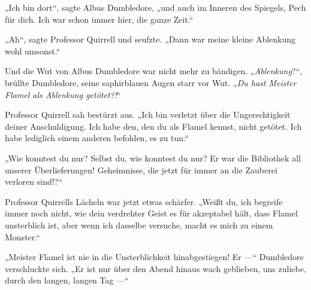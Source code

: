„Ich bin dort“, sagte Albus Dumbledore, „und auch im Inneren des Spiegels, Pech für dich. Ich war schon immer hier, die ganze Zeit.“

„Ah“, sagte Professor Quirrell und seufzte.
„Dann war meine kleine Ablenkung wohl umsonst.“

Und die Wut von Albus Dumbledore war nicht mehr zu bändigen.
„\emph{Ablenkung}?“, brüllte Dumbledore, seine saphirblauen Augen starr vor Wut.
„\emph{Du hast Meister Flamel als Ablenkung getötet?!}“

Professor Quirrell sah bestürzt aus.
„Ich bin verletzt über die Ungerechtigkeit deiner Anschuldigung. Ich habe den, den du als Flamel kennst, nicht getötet. Ich habe lediglich einem anderen befohlen, es zu tun.“

„Wie konntest du nur? Selbst du, wie konntest du nur? Er war die Bibliothek all unserer Überlieferungen! Geheimnisse, die jetzt für immer an die Zauberei verloren sind!?“

Professor Quirrells Lächeln war jetzt etwas schärfer.
„Weißt du, ich begreife immer noch nicht, wie dein verdrehter Geist es für akzeptabel hält, dass Flamel unsterblich ist, aber wenn ich dasselbe versuche, macht es mich zu einem Monster.“

„Meister Flamel ist nie in die Unsterblichkeit hinabgestiegen! Er —“ Dumbledore verschluckte sich.
„Er ist nur über den Abend hinaus wach geblieben, uns zuliebe, durch den langen, langen Tag —“

